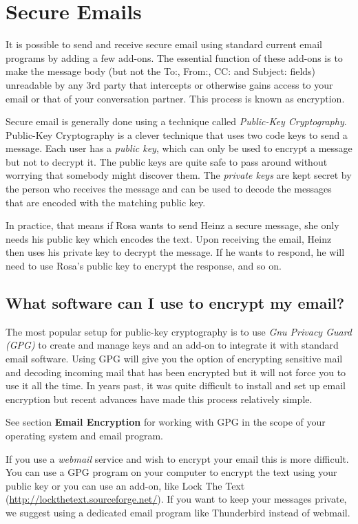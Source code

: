 \section{Secure Emails}

It is possible to send and receive secure email using standard current
email programs by adding a few add-ons. The essential function of these
add-ons is to make the message body (but not the To:, From:, CC: and
Subject: fields) unreadable by any 3rd party that intercepts or
otherwise gains access to your email or that of your conversation
partner. This process is known as encryption.

Secure email is generally done using a technique called \emph{Public-Key
Cryptography}. Public-Key Cryptography is a clever technique that uses
two code keys to send a message. Each user has a \emph{public key},
which can only be used to encrypt a message but not to decrypt it. The
public keys are quite safe to pass around without worrying that somebody
might discover them. The \emph{private keys} are kept secret by the
person who receives the message and can be used to decode the messages
that are encoded with the matching public key.

In practice, that means if Rosa wants to send Heinz a secure message,
she only needs his public key which encodes the text. Upon receiving the
email, Heinz then uses his private key to decrypt the message. If he
wants to respond, he will need to use Rosa's public key to encrypt the
response, and so on.

\subsection{What software can I use to encrypt my email?}

The most popular setup for public-key cryptography is to use \emph{Gnu
Privacy Guard (GPG)} to create and manage keys and an add-on to
integrate it with standard email software. Using GPG will give you the
option of encrypting sensitive mail and decoding incoming mail that has
been encrypted but it will not force you to use it all the time. In
years past, it was quite difficult to install and set up email
encryption but recent advances have made this process relatively simple.

See section \textbf{Email Encryption} for working with GPG in the scope
of your operating system and email program.

If you use a \emph{webmail} service and wish to encrypt your email this
is more difficult. You can use a GPG program on your computer to encrypt
the text using your public key or you can use an add-on, like Lock The
Text
(\href{http://lockthetext.sourceforge.net/}{http://lockthetext.sourceforge.net/}).
If you want to keep your messages private, we suggest using a dedicated
email program like Thunderbird instead of webmail.
